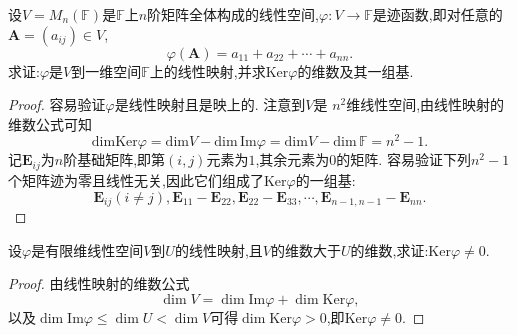 \documentclass[../../main.tex]{subfiles}%
\begin{document}
\begin{example}
设\(V = M_n(\mathbb{F})\)是\(\mathbb{F}\)上\(n\)阶矩阵全体构成的线性空间,\(\varphi:V\to\mathbb{F}\)是迹函数,即对任意的\(\boldsymbol{A}=(a_{ij})\in V\),
\[
\varphi(\boldsymbol{A})=a_{11}+a_{22}+\cdots + a_{nn}.
\]
求证:\(\varphi\)是\(V\)到一维空间\(\mathbb{F}\)上的线性映射,并求\(\text{Ker}\varphi\)的维数及其一组基.
\end{example}
\begin{proof}
容易验证\(\varphi\)是线性映射且是映上的. 注意到\(V\)是
$n^2$维线性空间,由线性映射的维数公式可知
\[
\mathrm{dimKer}\varphi =\mathrm{dim}V-\mathrm{dim}\,\mathrm{Im}\varphi =\mathrm{dim}V-\mathrm{dim}\,\mathbb{F} =n^2-1.
\]
记\(\boldsymbol{E}_{ij}\)为\(n\)阶基础矩阵,即第\((i,j)\)元素为\(1\),其余元素为\(0\)的矩阵. 容易验证下列\(n^2 - 1\)个矩阵迹为零且线性无关,因此它们组成了\(\text{Ker}\varphi\)的一组基:
\[
\boldsymbol{E}_{ij}(i\neq j),\boldsymbol{E}_{11}-\boldsymbol{E}_{22},\boldsymbol{E}_{22}-\boldsymbol{E}_{33},\cdots,\boldsymbol{E}_{n - 1,n - 1}-\boldsymbol{E}_{nn}. 
\]
\end{proof}

\begin{example}
设\(\varphi\)是有限维线性空间\(V\)到\(U\)的线性映射,且\(V\)的维数大于\(U\)的维数,求证:\(\text{Ker}\varphi\neq 0\).
\end{example}
\begin{proof}
由线性映射的维数公式
\[
\dim V=\dim\text{Im}\varphi+\dim\text{Ker}\varphi,
\]
以及\(\dim\text{Im}\varphi\leqslant \dim U<\dim V\)可得\(\dim\text{Ker}\varphi>0\),即\(\text{Ker}\varphi\neq 0\).
\end{proof}
\end{document}
